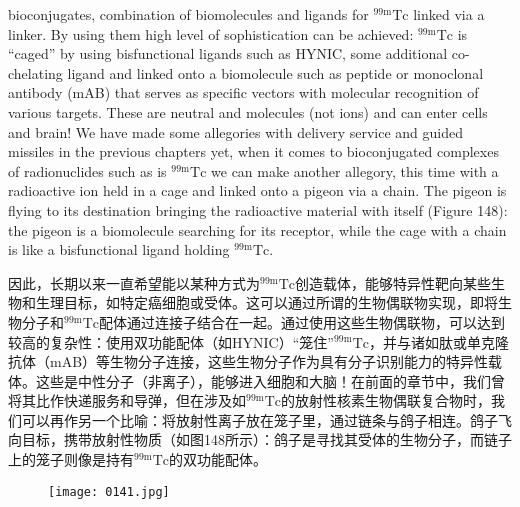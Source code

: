 \documentclass[dvipsnames, svgnames,a4paper,11pt]{article}
\begin{document}
bioconjugates, combination of biomolecules and ligands for ${}^\mathrm{99m}\mathrm{Tc}$ linked via a linker.
By using them high level of sophistication can be achieved: ${}^\mathrm{99m}\mathrm{Tc}$ is “caged” by using
bisfunctional ligands such as HYNIC, some additional co-chelating ligand and linked
onto a biomolecule such as peptide or monoclonal antibody (mAB) that serves as
specific vectors with molecular recognition of various targets. These are neutral and
molecules (not ions) and can enter cells and brain! We have made some allegories
with delivery service and guided missiles in the previous chapters yet, when it comes
to bioconjugated complexes of radionuclides such as is ${}^\mathrm{99m}\mathrm{Tc}$ we can make another
allegory, this time with a radioactive ion held in a cage and linked onto a pigeon via a
chain. The pigeon is flying to its destination bringing the radioactive material with
itself (Figure 148): the pigeon is a biomolecule searching for its receptor, while the
cage with a chain is like a bisfunctional ligand holding ${}^\mathrm{99m}\mathrm{Tc}$.

因此，长期以来一直希望能以某种方式为${}^\mathrm{99m}\mathrm{Tc}$创造载体，能够特异性靶向某些生物和生理目标，如特定癌细胞或受体。这可以通过所谓的生物偶联物实现，即将生物分子和${}^\mathrm{99m}\mathrm{Tc}$配体通过连接子结合在一起。通过使用这些生物偶联物，可以达到较高的复杂性：使用双功能配体（如HYNIC）“笼住”${}^\mathrm{99m}\mathrm{Tc}$，并与诸如肽或单克隆抗体（mAB）等生物分子连接，这些生物分子作为具有分子识别能力的特异性载体。这些是中性分子（非离子），能够进入细胞和大脑！在前面的章节中，我们曾将其比作快递服务和导弹，但在涉及如${}^\mathrm{99m}\mathrm{Tc}$的放射性核素生物偶联复合物时，我们可以再作另一个比喻：将放射性离子放在笼子里，通过链条与鸽子相连。鸽子飞向目标，携带放射性物质（如图148所示）：鸽子是寻找其受体的生物分子，而链子上的笼子则像是持有${}^\mathrm{99m}\mathrm{Tc}$的双功能配体。

\begin{figure}[h]
	\centering
    \texttt{[image: 0141.jpg]}    
     \label{fig148}
\end{figure}
\end{document}

